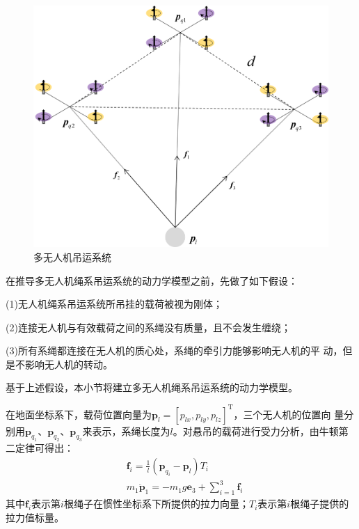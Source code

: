 \documentclass[lang=chs, degree=master, blindreview=true, winfonts=true]{yanputhesis}
\begin{document}
\begin{figure}[hbt!]
	\centering
	\includegraphics[width=28pc]{picture/2_3.png} 
	\caption{多无人机吊运系统} \label{2_3}
\end{figure}

在推导多无人机绳系吊运系统的动力学模型之前，先做了如下假设：



(1)无人机绳系吊运系统所吊挂的载荷被视为刚体； 


(2)连接无人机与有效载荷之间的系绳没有质量，且不会发生缠绕；

(3)所有系绳都连接在无人机的质心处，系绳的牵引力能够影响无人机的平
动，但是不影响无人机的转动。 

基于上述假设，本小节将建立多无人机绳系吊运系统的动力学模型。


在地面坐标系下，载荷位置向量为$\bm p_{l}=[p_{lx},p_{ly},p_{lz}]^{\mathrm{T}}$，三个无人机的位置向
量分别用$\bm p_{q_1}$、$\bm p_{q_2}$、$\bm p_{q_3}$来表示，系绳长度为$l$。对悬吊的载荷进行受力分析，由牛顿第二定律可得出：
\begin{equation}
	\label{2-15}
	\begin{aligned}
		&\bm f_{i}=\frac{1}{l}(\bm p_{q_i}-\bm p_{l})T_{i} \\
		&m_{1}\ddot{\bm p}_{1}=-m_{1}g\bm e_{3}+\sum_{i=1}^{3}\bm f_{i}
	\end{aligned}
\end{equation}
其中$\bm f_{i}$表示第$i$根绳子在惯性坐标系下所提供的拉力向量；$T_{i}$表示第$i$根绳子提供的拉力值标量。
\end{document}
